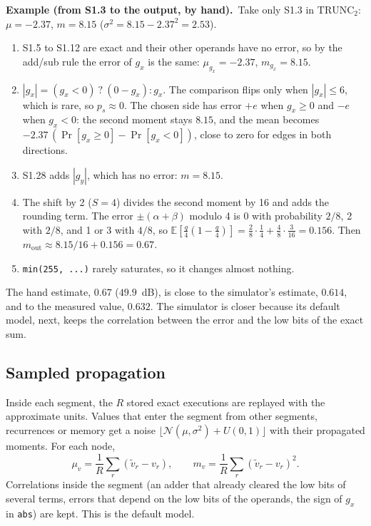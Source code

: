 \documentclass[11pt,a4paper]{article}
\newcommand{\E}{\mathbb{E}}
\newcommand{\examplebox}[2]{\par\medskip\noindent\colorbox{tabAzul!6}{\begin{minipage}{\dimexpr\linewidth-2\fboxsep}
  \textbf{Example (#1).}\ #2\end{minipage}}\par\medskip}
\begin{document}
\examplebox{from S1.3 to the output, by hand}{Take only S1.3 in $\text{TRUNC}_2$: $\mu = -2.37$, $m = 8.15$
($\sigma^2 = 8.15 - 2.37^2 = 2.53$).
\begin{enumerate}
  \item S1.5 to S1.12 are exact and their other operands have no error, so by the add/sub rule the error of $g_x$ is
    the same: $\mu_{g_x} = -2.37$, $m_{g_x} = 8.15$.
  \item $|g_x| = (g_x < 0)\ ?\ (0 - g_x) : g_x$. The comparison flips only when $|g_x| \le 6$, which is rare, so
    $p_s \approx 0$. The chosen side has error $+e$ when $g_x \ge 0$ and $-e$ when $g_x < 0$: the second moment stays
    $8.15$, and the mean becomes $-2.37\,(\Pr[g_x \ge 0] - \Pr[g_x < 0])$, close to zero for edges in both directions.
  \item S1.28 adds $|g_y|$, which has no error: $m = 8.15$.
  \item The shift by 2 ($S = 4$) divides the second moment by 16 and adds the rounding term. The error
    $\pm(\alpha + \beta)$ modulo 4 is 0 with probability $2/8$, 2 with $2/8$, and 1 or 3 with $4/8$, so
    $\E[\tfrac{q}{4}(1 - \tfrac{q}{4})] = \tfrac{2}{8}\cdot\tfrac{1}{4} + \tfrac{4}{8}\cdot\tfrac{3}{16} = 0.156$.
    Then $m_{\text{out}} \approx 8.15/16 + 0.156 = 0.67$.
  \item \texttt{min(255, ...)} rarely saturates, so it changes almost nothing.
\end{enumerate}
The hand estimate, $0.67$ ($49.9$~dB), is close to the simulator's estimate, $0.614$, and to the measured value,
$0.632$. The simulator is closer because its default model, next, keeps the correlation between the error and the low
bits of the exact sum.}

\subsection{Sampled propagation}

Inside each segment, the $R$ stored exact executions are replayed with the approximate units. Values that enter the
segment from other segments, recurrences or memory get a noise $\lfloor \mathcal{N}(\mu, \sigma^2) + U(0,1) \rfloor$
with their propagated moments. For each node,
\[
  \mu_v = \frac{1}{R} \sum_{r} (\tilde v_r - v_r), \qquad m_v = \frac{1}{R} \sum_{r} (\tilde v_r - v_r)^2 .
\]
Correlations inside the segment (an adder that already cleared the low bits of several terms, errors that depend on the
low bits of the operands, the sign of $g_x$ in \texttt{abs}) are kept. This is the default model.
\end{document}
